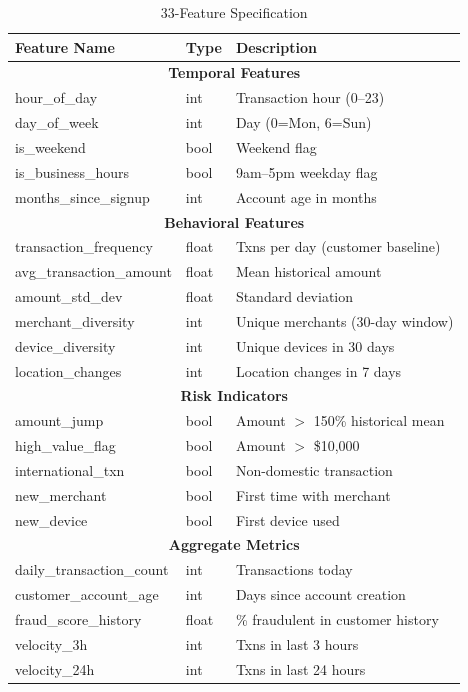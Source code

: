 \documentclass[11pt,a4paper]{article}
\begin{document}
\begin{table}[h]
\centering
\caption{33-Feature Specification}
\tiny
\begin{tabular}{|p{2.8cm}|p{1.5cm}|p{4.2cm}|}
\hline
\textbf{Feature Name} & \textbf{Type} & \textbf{Description} \\
\hline
\multicolumn{3}{|c|}{\textbf{Temporal Features}} \\
\hline
hour\_of\_day & int & Transaction hour (0--23) \\
day\_of\_week & int & Day (0=Mon, 6=Sun) \\
is\_weekend & bool & Weekend flag \\
is\_business\_hours & bool & 9am--5pm weekday flag \\
months\_since\_signup & int & Account age in months \\
\hline
\multicolumn{3}{|c|}{\textbf{Behavioral Features}} \\
\hline
transaction\_frequency & float & Txns per day (customer baseline) \\
avg\_transaction\_amount & float & Mean historical amount \\
amount\_std\_dev & float & Standard deviation \\
merchant\_diversity & int & Unique merchants (30-day window) \\
device\_diversity & int & Unique devices in 30 days \\
location\_changes & int & Location changes in 7 days \\
\hline
\multicolumn{3}{|c|}{\textbf{Risk Indicators}} \\
\hline
amount\_jump & bool & Amount $>$ 150\% historical mean \\
high\_value\_flag & bool & Amount $>$ \$10,000 \\
international\_txn & bool & Non-domestic transaction \\
new\_merchant & bool & First time with merchant \\
new\_device & bool & First device used \\
\hline
\multicolumn{3}{|c|}{\textbf{Aggregate Metrics}} \\
\hline
daily\_transaction\_count & int & Transactions today \\
customer\_account\_age & int & Days since account creation \\
fraud\_score\_history & float & \% fraudulent in customer history \\
velocity\_3h & int & Txns in last 3 hours \\
velocity\_24h & int & Txns in last 24 hours \\
\hline
\end{tabular}
\end{table}
\end{document}
